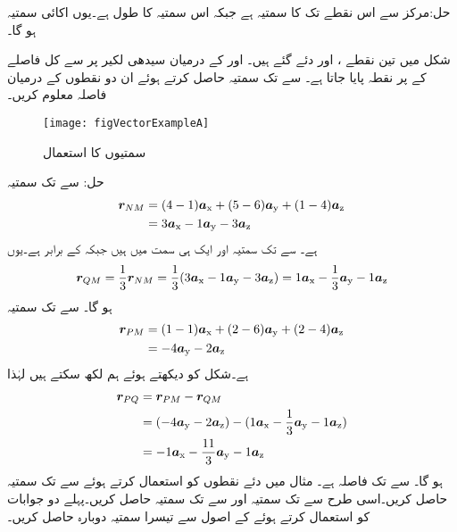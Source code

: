 حل:مرکز سے اس نقطے تک کا سمتیہ  ہے جبکہ اس سمتیہ  کا طول  ہے۔یوں اکائی سمتیہ  ہو گا۔

شکل  میں تین نقطے ،  اور  دئے گئے ہیں۔ اور  کے درمیان سیدھی لکیر پر  سے کل فاصلے کے   پر نقطہ  پایا جاتا ہے۔ سے  تک سمتیہ حاصل کرتے ہوئے ان دو نقطوں کے درمیان فاصلہ معلوم کریں۔
\begin{figure}
\centering
\texttt{[image: figVectorExampleA]}
\caption{سمتیوں کا استعمال}
\label{شکل_سمتیہ_استعمال_سمتیہ_مثال}
\end{figure}
حل: سے  تک سمتیہ
\begin{align*}
\kvec{r}_{NM}&=(4-1)\ax+(5-6)\ay+(1-4)\az\\
&=3\ax-1\ay-3\az
\end{align*}
ہے۔ سے  تک سمتیہ  اور  ایک ہی سمت میں ہیں جبکہ  کے برابر ہے۔یوں
\begin{align*}
\kvec{r}_{QM}=\frac{1}{3}\kvec{r}_{NM}=\frac{1}{3}(3\ax-1\ay-3\az)=1\ax-\frac{1}{3}\ay-1\az
\end{align*}
ہو گا۔ سے  تک سمتیہ
\begin{align*}
\kvec{r}_{PM}&=(1-1)\ax+(2-6)\ay+(2-4)\az\\
&=-4\ay-2\az
\end{align*}
ہے۔شکل کو دیکھتے ہوئے ہم لکھ سکتے ہیں  لہٰذا
\begin{align*}
\kvec{r}_{PQ}&=\kvec{r}_{PM}-\kvec{r}_{QM}\\
&=(-4\ay-2\az)-(1\ax-\frac{1}{3}\ay-1\az)\\
&=-1\ax-\frac{11}{3}\ay-1\az
\end{align*}
ہو گا۔ سے  تک فاصلہ  ہے۔
مثال  میں دئے نقطوں کو استعمال کرتے ہوئے  سے  تک سمتیہ حاصل کریں۔اسی طرح  سے  تک سمتیہ اور  سے  تک سمتیہ حاصل کریں۔پہلے دو جوابات کو استعمال کرتے ہوئے  کے اصول سے تیسرا سمتیہ دوبارہ حاصل کریں۔

